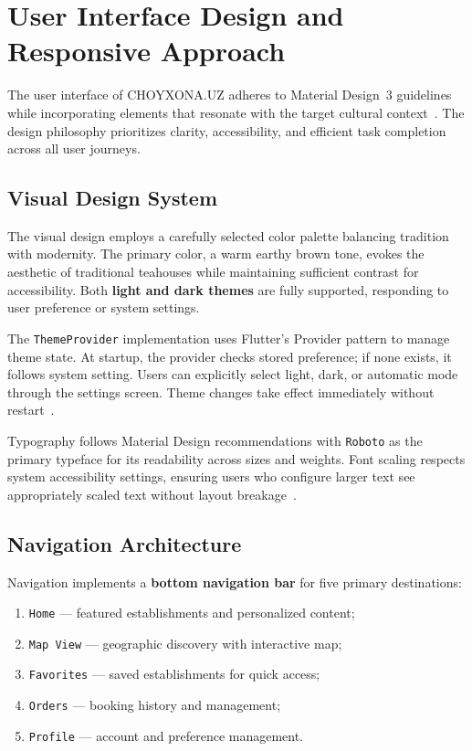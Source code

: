 \section{User Interface Design and Responsive Approach}
\label{sec:ui-design}

The user interface of CHOYXONA.UZ adheres to Material Design~3 guidelines while incorporating elements that resonate with the target cultural context~\cite{material2024}.
The design philosophy prioritizes clarity, accessibility, and efficient task completion across all user journeys.

\subsection{Visual Design System}
\label{subsec:visual-design}

The visual design employs a carefully selected color palette balancing tradition with modernity.
The primary color, a warm earthy brown tone, evokes the aesthetic of traditional teahouses while maintaining sufficient contrast for accessibility.
Both \textbf{light and dark themes} are fully supported, responding to user preference or system settings.

The \texttt{ThemeProvider} implementation uses Flutter's Provider pattern to manage theme state.
At startup, the provider checks stored preference; if none exists, it follows system setting.
Users can explicitly select light, dark, or automatic mode through the settings screen.
Theme changes take effect immediately without restart~\cite{flutter_state2024}.

Typography follows Material Design recommendations with \texttt{Roboto} as the primary typeface for its readability across sizes and weights.
Font scaling respects system accessibility settings, ensuring users who configure larger text see appropriately scaled text without layout breakage~\cite{nielsen2012}.

\subsection{Navigation Architecture}
\label{subsec:navigation}

Navigation implements a \textbf{bottom navigation bar} for five primary destinations:
\begin{enumerate}
  \item \texttt{Home} --- featured establishments and personalized content;
  \item \texttt{Map View} --- geographic discovery with interactive map;
  \item \texttt{Favorites} --- saved establishments for quick access;
  \item \texttt{Orders} --- booking history and management;
  \item \texttt{Profile} --- account and preference management.
\end{enumerate}

